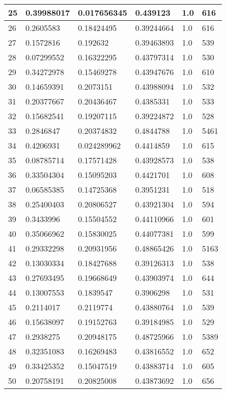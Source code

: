 \begin{longtable}{|l|l|l|l|l|l|}
25 & 0.39988017 & 0.017656345 & 0.439123 & 1.0 & 616 \\ \hline 
26 & 0.2605583 & 0.18424495 & 0.39244664 & 1.0 & 616 \\ \hline 
27 & 0.1572816 & 0.192632 & 0.39463893 & 1.0 & 539 \\ \hline 
28 & 0.07299552 & 0.16322295 & 0.43797314 & 1.0 & 530 \\ \hline 
29 & 0.34272978 & 0.15469278 & 0.43947676 & 1.0 & 610 \\ \hline 
30 & 0.14659391 & 0.2073151 & 0.43988094 & 1.0 & 532 \\ \hline 
31 & 0.20377667 & 0.20436467 & 0.4385331 & 1.0 & 533 \\ \hline 
32 & 0.15682541 & 0.19207115 & 0.39224872 & 1.0 & 528 \\ \hline 
33 & 0.2846847 & 0.20374832 & 0.4844788 & 1.0 & 5461 \\ \hline 
34 & 0.4206931 & 0.024289962 & 0.4414859 & 1.0 & 615 \\ \hline 
35 & 0.08785714 & 0.17571428 & 0.43928573 & 1.0 & 538 \\ \hline 
36 & 0.33504304 & 0.15095203 & 0.4421701 & 1.0 & 608 \\ \hline 
37 & 0.06585385 & 0.14725368 & 0.3951231 & 1.0 & 518 \\ \hline 
38 & 0.25400403 & 0.20806527 & 0.43921304 & 1.0 & 594 \\ \hline 
39 & 0.3433996 & 0.15504552 & 0.44110966 & 1.0 & 601 \\ \hline 
40 & 0.35066962 & 0.15830025 & 0.44077381 & 1.0 & 599 \\ \hline 
41 & 0.29332298 & 0.20931956 & 0.48865426 & 1.0 & 5163 \\ \hline 
42 & 0.13030334 & 0.18427688 & 0.39126313 & 1.0 & 538 \\ \hline 
43 & 0.27693495 & 0.19668649 & 0.43903974 & 1.0 & 644 \\ \hline 
44 & 0.13007553 & 0.1839547 & 0.3906298 & 1.0 & 531 \\ \hline 
45 & 0.2114017 & 0.2119774 & 0.43880764 & 1.0 & 539 \\ \hline 
46 & 0.15638097 & 0.19152763 & 0.39184985 & 1.0 & 529 \\ \hline 
47 & 0.2938275 & 0.20948175 & 0.48725966 & 1.0 & 5389 \\ \hline 
48 & 0.32351083 & 0.16269483 & 0.43816552 & 1.0 & 652 \\ \hline 
49 & 0.33425352 & 0.15047519 & 0.43883714 & 1.0 & 605 \\ \hline 
50 & 0.20758191 & 0.20825008 & 0.43873692 & 1.0 & 656 \\ \hline 
\end{longtable}